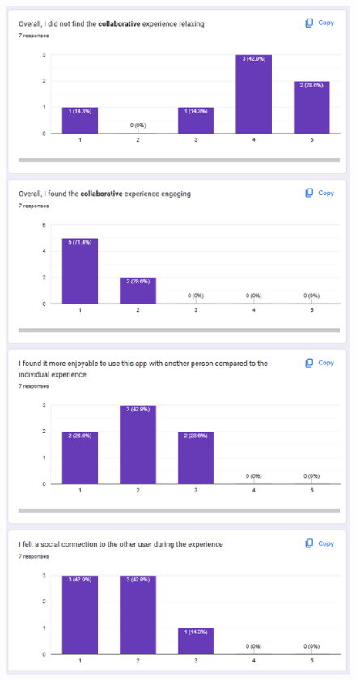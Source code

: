 \begin{appendices}
\begin{figure}[htb]
\end{figure}
\begin{figure}[htb]
    \centering
    \includegraphics[width=0.8\linewidth]{images/survey-results/9.png}    
\end{figure}
\begin{figure}[htb]
    \centering

\end{figure}
\end{appendices}
